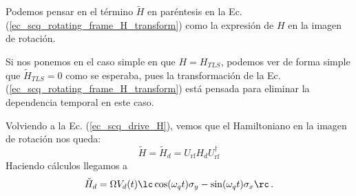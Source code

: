         Podemos pensar en el término $\tilde{H}$ en paréntesis en la Ec. (\ref{ec_scq_rotating_frame_H_transform}) como la expresión de $H$ en la imagen de rotación. 
        
        Si nos ponemos en el caso simple en que $H = H_{TLS}$, podemos ver de forma simple que  $\tilde{H}_{TLS} = 0$ como se esperaba, pues la transformación de la Ec. (\ref{ec_scq_rotating_frame_H_transform}) está pensada para eliminar la dependencia temporal en este caso. 
        
        Volviendo a la Ec. (\ref{ec_scq_drive_H}), vemos que el Hamiltoniano en la imagen de rotación nos queda:
        \begin{equation} \label{ec_scq_rf_Hd_1}
        \tilde{H} = \tilde{H}_d = U_{\mathrm{rf}} H_d U_{\mathrm{rf}}^\dagger 
        \end{equation}
        Haciendo cálculos llegamos a
        \begin{equation} \label{ec_scq_rf_Hd}
        \tilde{H}_d = \Omega V_d(t) \lc \cos (\omega_q t)\sigma_y - \sin(\omega_q t) \sigma_x \rc \,.
        \end{equation}
        
        
        
        
        

